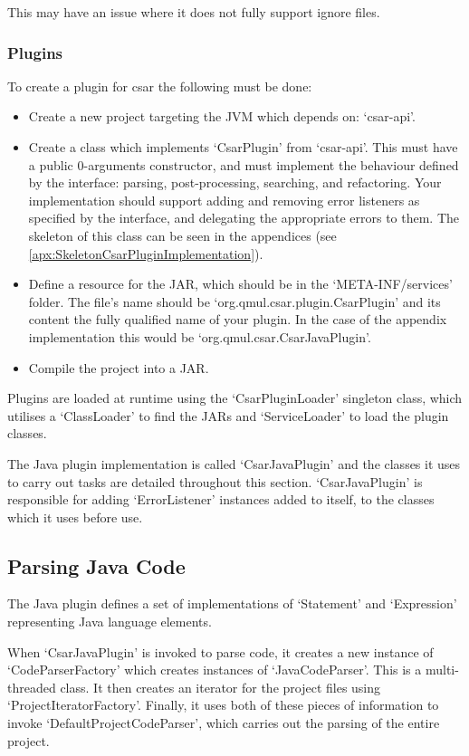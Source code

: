 \documentclass[12pt, letterpaper]{article}
\begin{document}
This may have an issue where it does not fully support ignore files.

\subsubsection{Plugins}
To create a plugin for csar the following must be done:
\begin{itemize}
  \item Create a new project targeting the JVM which depends on: `csar-api'.
  \item Create a class which implements `CsarPlugin' from `csar-api'.
  This must have a public 0-arguments constructor, and must implement the behaviour defined by the interface: parsing, post-processing, searching, and refactoring.
  Your implementation should support adding and removing error listeners as specified by the interface, and delegating the appropriate errors to them.
  The skeleton of this class can be seen in the appendices (see \ref{apx:SkeletonCsarPluginImplementation}).
  \item Define a resource for the JAR, which should be in the `META-INF/services' folder.
  The file's name should be `org.qmul.csar.plugin.CsarPlugin' and its content the fully qualified name of your plugin.
  In the case of the appendix implementation this would be `org.qmul.csar.CsarJavaPlugin'.
  \item Compile the project into a JAR.
\end{itemize}

Plugins are loaded at runtime using the `CsarPluginLoader' singleton class, which utilises a `ClassLoader' to find the JARs and `ServiceLoader' to load the plugin classes.

The Java plugin implementation is called `CsarJavaPlugin' and the classes it uses to carry out tasks are detailed throughout this section.
`CsarJavaPlugin' is responsible for adding `ErrorListener' instances added to itself, to the classes which it uses before use.

\subsection{Parsing Java Code}
The Java plugin defines a set of implementations of `Statement' and `Expression' representing Java language elements.

When `CsarJavaPlugin' is invoked to parse code, it creates a new instance of `CodeParserFactory' which creates instances of `JavaCodeParser'.
This is a multi-threaded class.
It then creates an iterator for the project files using `ProjectIteratorFactory'.
Finally, it uses both of these pieces of information to invoke `DefaultProjectCodeParser', which carries out the parsing of the entire project.
\end{document}
